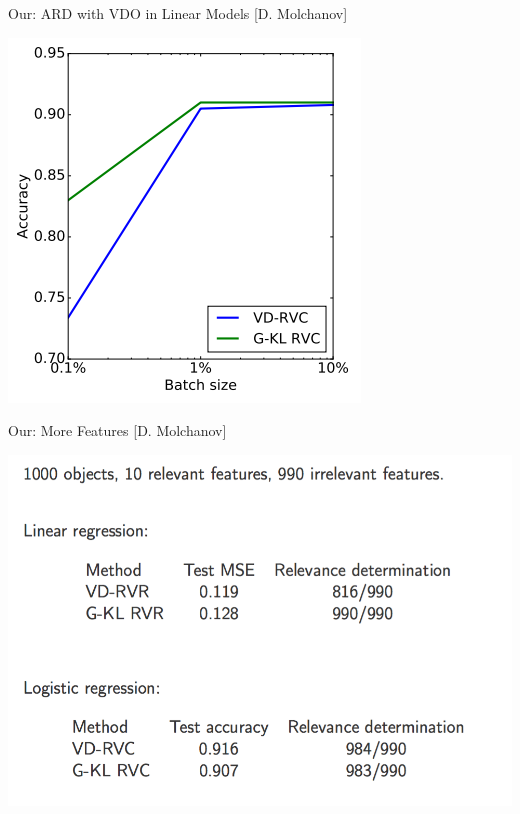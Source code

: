 \documentclass{beamer}
\begin{document}
\begin{frame}{Our: ARD with VDO in Linear Models {\scriptsize[D. Molchanov]}}
\begin{itemize}
\begin{center}
						\includegraphics[scale=0.3]{./img/mser.png}
					\end{center}
	\end{itemize}
\end{frame}

\begin{frame}{Our: More Features {\scriptsize[D. Molchanov]}}
		\begin{center}
			\includegraphics[scale=0.3]{./img/1000.png}
		\end{center}\end{frame}
\end{document}
